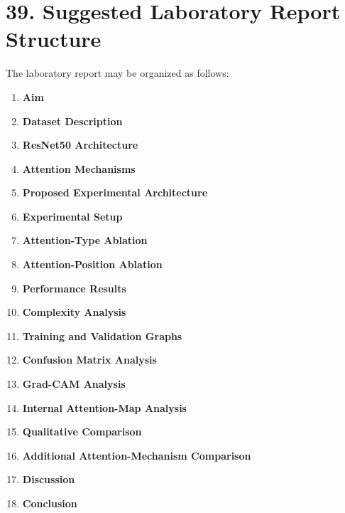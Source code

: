 \documentclass[10pt]{article}
\begin{document}
\section*{39. Suggested Laboratory Report Structure}

The laboratory report may be organized as follows:

\begin{enumerate}

\item \textbf{Aim}

\item \textbf{Dataset Description}

\item \textbf{ResNet50 Architecture}

\item \textbf{Attention Mechanisms}

\item \textbf{Proposed Experimental Architecture}

\item \textbf{Experimental Setup}

\item \textbf{Attention-Type Ablation}

\item \textbf{Attention-Position Ablation}

\item \textbf{Performance Results}

\item \textbf{Complexity Analysis}

\item \textbf{Training and Validation Graphs}

\item \textbf{Confusion Matrix Analysis}

\item \textbf{Grad-CAM Analysis}

\item \textbf{Internal Attention-Map Analysis}

\item \textbf{Qualitative Comparison}

\item \textbf{Additional Attention-Mechanism Comparison}

\item \textbf{Discussion}

\item \textbf{Conclusion}

\end{enumerate}
\end{document}
